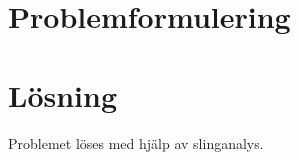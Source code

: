 \documentclass[a4paper,12pt]{article}
\begin{document}
\maketitle
\thispagestyle{empty}
\newpage

\section*{Problemformulering}

\section*{Lösning}
Problemet löses med hjälp av slinganalys.







\end{document}
